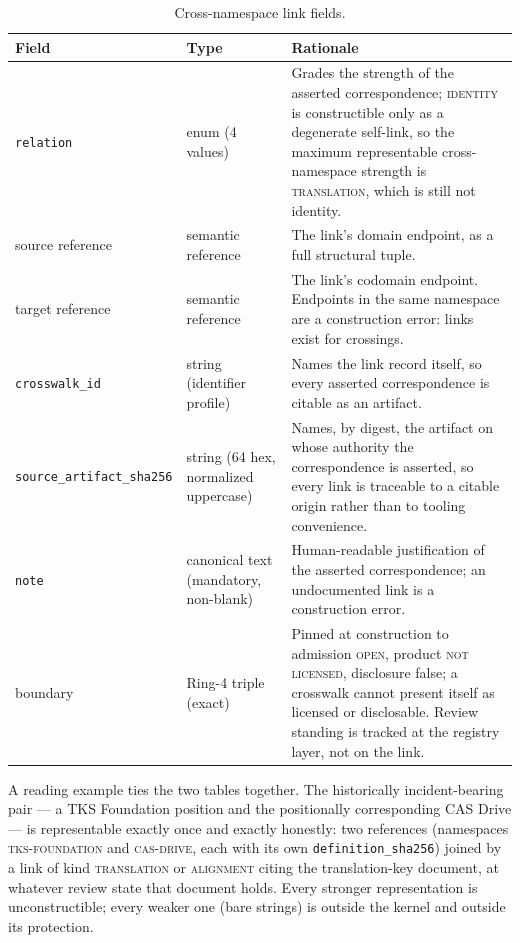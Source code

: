 \begin{table}[htbp]
\centering
\caption{Cross-namespace link fields.}
\label{tables:tab:links}
\begin{tabular}{@{}p{}p{}p{}@{}}
\toprule
Field & Type & Rationale \\
\midrule
\texttt{relation} & enum (4 values) & Grades the strength of the asserted correspondence; \textsc{identity} is constructible only as a degenerate self-link, so the maximum representable cross-namespace strength is \textsc{translation}, which is still not identity. \\
\addlinespace
source reference & semantic reference & The link's domain endpoint, as a full structural tuple. \\
\addlinespace
target reference & semantic reference & The link's codomain endpoint. Endpoints in the same namespace are a construction error: links exist for crossings. \\
\addlinespace
\texttt{crosswalk\_id} & string (identifier profile) & Names the link record itself, so every asserted correspondence is citable as an artifact. \\
\addlinespace
\texttt{source\_artifact\_sha256} & string (64 hex, normalized uppercase) & Names, by digest, the artifact on whose authority the correspondence is asserted, so every link is traceable to a citable origin rather than to tooling convenience. \\
\addlinespace
\texttt{note} & canonical text (mandatory, non-blank) & Human-readable justification of the asserted correspondence; an undocumented link is a construction error. \\
\addlinespace
boundary & Ring-4 triple (exact) & Pinned at construction to admission \textsc{open}, product \textsc{not licensed}, disclosure false; a crosswalk cannot present itself as licensed or disclosable. Review standing is tracked at the registry layer, not on the link. \\
\bottomrule
\end{tabular}
\end{table}

A reading example ties the two tables together. The historically incident-bearing pair --- a TKS Foundation position and the positionally corresponding CAS Drive --- is representable exactly once and exactly honestly: two references (namespaces \textsc{tks-foundation} and \textsc{cas-drive}, each with its own \texttt{definition\_sha256}) joined by a link of kind \textsc{translation} or \textsc{alignment} citing the translation-key document, at whatever review state that document holds. Every stronger representation is unconstructible; every weaker one (bare strings) is outside the kernel and outside its protection.

